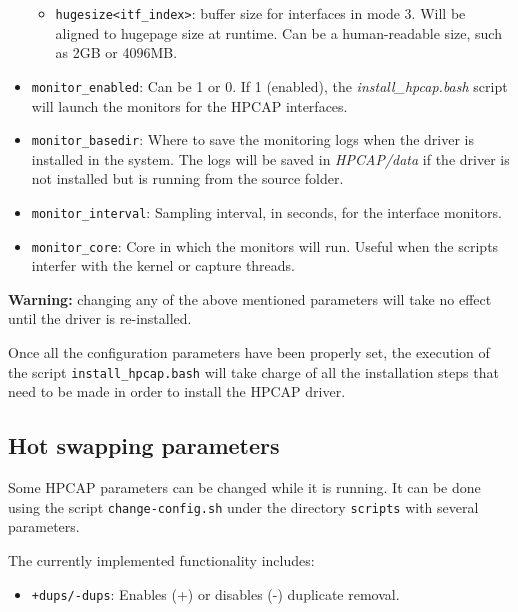 \documentclass[a4paper,oneside]{hpman}
\begin{document}
\begin{itemize}
\begin{itemize}
        \item \texttt{hugesize<itf\_index>}: buffer size for interfaces in mode 3. Will be aligned to hugepage size at runtime. Can be a human-readable size, such as 2GB or 4096MB.


    \end{itemize}

    \item \texttt{monitor\_enabled}: Can be 1 or 0. If 1 (enabled), the \textit{install\_hpcap.bash} script will launch the monitors for the HPCAP interfaces.

    \item \texttt{monitor\_basedir}: Where to save the monitoring logs when the driver is installed in the system. The logs will be saved in \textit{HPCAP/data} if the driver is not installed but is running from the source folder.

    \item \texttt{monitor\_interval}: Sampling interval, in seconds, for the interface monitors.

    \item \texttt{monitor\_core}: Core in which the monitors will run. Useful when the scripts interfer with the kernel or capture threads.
\end{itemize}

\textbf{Warning:} changing any of the above mentioned parameters will take no effect until the driver is re-installed.

Once all the configuration parameters have been properly set, the execution of the script \texttt{install\_hpcap.bash} will take charge of all the installation steps that need to be made in order to install the HPCAP driver.

\subsection{Hot swapping parameters}
\label{sec:Params:HotSwapping}

Some HPCAP parameters can be changed while it is running. It can be done using the script \texttt{change-config.sh} under the directory \texttt{scripts} with several parameters.

The currently implemented functionality includes:
\begin{itemize}
    \item \texttt{+dups/-dups}: Enables (+) or disables (-) duplicate removal.
\end{itemize}
\end{document}
